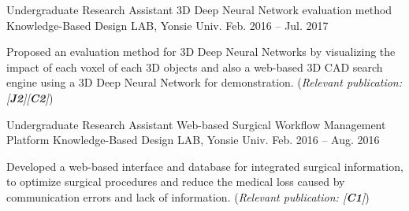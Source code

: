 \begin{cventries}
\cventry
{Undergraduate Research Assistant} %
{3D Deep Neural Network evaluation method} %
{Knowledge-Based Design LAB, Yonsie Univ.} %
{Feb. 2016 – Jul. 2017} %
{ %
\begin{cvitems}
\item {Proposed an evaluation method for 3D Deep Neural Networks by visualizing the impact of each voxel of each 3D objects and also a web-based 3D CAD search engine using a 3D Deep Neural Network for demonstration. (\textit{Relevant publication: [\textbf{J2}][\textbf{C2}]})}
\end{cvitems}
}

\cventry
{Undergraduate Research Assistant} %
{Web-based Surgical Workflow Management Platform} %
{Knowledge-Based Design LAB, Yonsie Univ.} %
{Feb. 2016 – Aug. 2016} %
{ %
\begin{cvitems}
\item {Developed a web-based interface and database for integrated surgical information, to optimize surgical procedures and reduce the medical loss caused by communication errors and lack of information. (\textit{Relevant publication: [\textbf{C1}]})}
\end{cvitems}
}

\end{cventries}